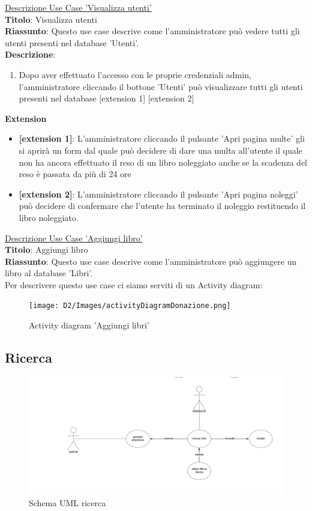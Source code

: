 \documentclass{article}
\begin{document}
\noindent\underline{Descrizione Use Case 'Visualizza utenti'}\\
    \textbf{Titolo}: Visualizza utenti\\
    \textbf{Riassunto}: Questo use case descrive come l'amministratore può vedere tutti gli utenti presenti nel database 'Utenti'.\\
    \textbf{Descrizione}: 
    \begin{enumerate}
        \item Dopo aver effettuato l'accesso con le proprie credenziali admin, l'amministratore cliccando il bottone 'Utenti' può visualizzare tutti gli utenti presenti nel database [extension 1] [extension 2]
    \end{enumerate}
        \textbf{Extension}
    \begin{itemize}
        \item \textbf{[extension 1]}: L'amministratore cliccando il pulsante 'Apri pagina multe' gli si aprirà un form dal quale può decidere di dare una multa all'utente il quale non ha ancora effettuato il reso di un libro noleggiato anche se la scadenza del reso è passata da più di 24 ore
        \item \textbf{[extension 2]}: L'amministratore cliccando il pulsante 'Apri pagina noleggi' può decidere di confermare che l'utente ha terminato il noleggio restituendo il libro noleggiato.
    \end{itemize}

     \noindent\underline{Descrizione Use Case 'Aggiungi libro'}\\
    \textbf{Titolo}: Aggiungi libro\\
    \textbf{Riassunto}: Questo use case descrive come l'amministratore può aggiungere un libro al database 'Libri'.\\
    Per descrivere questo use case ci siamo serviti di un Activity diagram:
    \begin{figure}[H]
    \centering
    \texttt{[image: D2/Images/activityDiagramDonazione.png]}
    \caption{Activity diagram 'Aggiungi libri'}
\end{figure}

    \subsection{Ricerca}
    \begin{figure}[H]
    \centering
    \includegraphics[width=130mm]{D2/Images/ricercaUML.png}
    \caption{Schema UML ricerca}
\end{figure}
\end{document}
